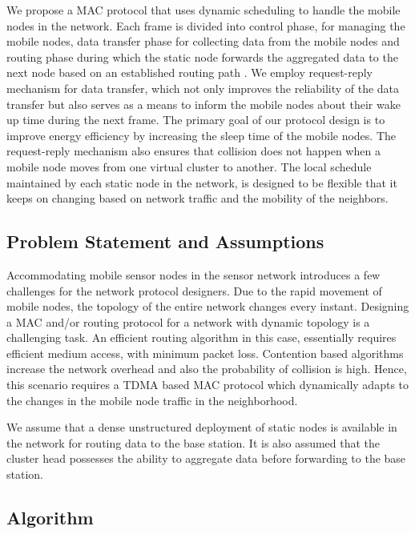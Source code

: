 We propose a MAC protocol that uses dynamic scheduling to handle the mobile nodes in the network. Each frame is divided into control phase, for managing the mobile nodes, data transfer phase for collecting data from the mobile nodes and routing phase during which the static node forwards the aggregated data to the next node based on an established routing path \cite{aodv}. We employ request-reply mechanism for data transfer, which not only improves the reliability of the data transfer but also serves as a means to inform the mobile nodes about their wake up time during the next frame. The primary goal of our protocol design is to improve energy efficiency by increasing the sleep time of the mobile nodes. The request-reply mechanism also ensures that collision does not happen when a mobile node moves from one virtual cluster \cite{smac} to another. The local schedule maintained by each static node in the network, is designed to be flexible that it keeps on changing based on network traffic and the mobility of the neighbors.

\subsection{Problem Statement and Assumptions}
Accommodating mobile sensor nodes in the sensor network introduces a few challenges for the network protocol designers. Due to the rapid movement of mobile nodes, the topology of the entire network changes every instant. Designing a MAC and/or routing protocol for a network with dynamic topology is a challenging task. An efficient routing algorithm in this case, essentially requires efficient medium access, with minimum packet loss. Contention based algorithms increase the network overhead and also the probability of collision is high. Hence, this scenario requires a TDMA based MAC protocol which dynamically adapts to the changes in the mobile node traffic in the neighborhood.  

We assume that a dense unstructured deployment of static nodes is available in the network for routing data to the base station. It is also assumed that the cluster head possesses the ability to aggregate data before forwarding to the base station.

\subsection{Algorithm}

